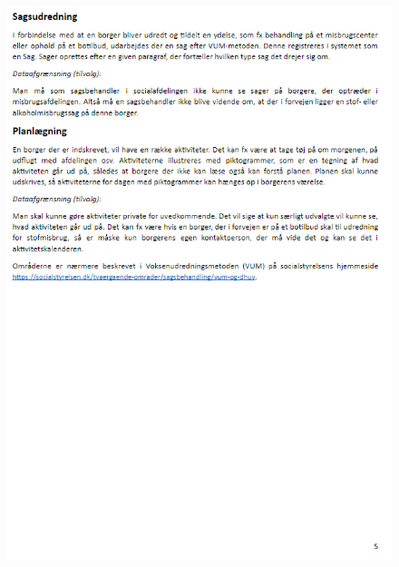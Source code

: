 \begin{figure}[hbt!]
\begin{center}
  \includegraphics[scale = 1]{./PNG/Case/Case_5.png} 
\end{center}
\end{figure}